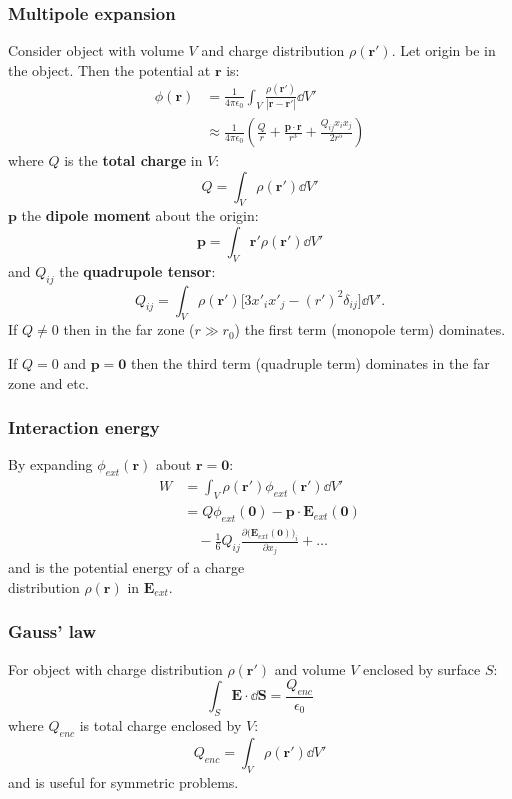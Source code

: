 \documentclass{article}
\newcommand{\vc}[1]{\boldsymbol{#1}}
\begin{document}
\begin{multicols*}{3}
\subsubsection*{Multipole expansion}
Consider object with volume $V$ and charge distribution
$\rho(\vc{r}')$. Let origin be in the object.
Then the potential at $\vc{r}$ is:
\begin{align*}
    \phi(\vc{r})
    &=\frac{1}{4\pi\epsilon_0}\int_V
    \frac{\rho(\vc{r}')}{|\vc{r}-\vc{r}'|}\dd V' \\
    &\approx\frac{1}{4\pi\epsilon_0}\left(
    \frac{Q}{r}+\frac{\vc{p}\cdot\vc{r}}{r^3}
    +\frac{Q_{ij}x_i x_j}{2r^5}\right)
\end{align*}
where $Q$ is the \textbf{total charge} in $V$:
$$Q=\int_V\rho(\vc{r}')\dd V'$$
$\vc{p}$ the \textbf{dipole moment} about the origin:
$$\vc{p}=\int_V\vc{r}'\rho(\vc{r}')\dd V'$$
and $Q_{ij}$ the \textbf{quadrupole tensor}:
$$Q_{ij}=\int_V\rho(\vc{r}')
\bigg[3x'_i x'_j-(r')^2\delta_{ij}\bigg]\dd V'.$$
If $Q\neq0$ then in the far zone ($r\gg r_0$)
the first term (monopole term) dominates.

If $Q=0$ and $\vc{p}=\vc{0}$ then
the third term (quadruple term)
dominates in the far zone and etc.

\subsubsection*{Interaction energy}
By expanding $\phi_{ext}(\vc{r})$ about $\vc{r}=\vc{0}$:
\begin{align*}
    W
    &=\int_V\rho(\vc{r}')\phi_{ext}(\vc{r}')\dd V' \\
    &=Q\phi_{ext}(\vc{0})-\vc{p}\cdot\vc{E}_{ext}(\vc{0}) \\
    &\quad-\frac{1}{6}Q_{ij}\frac{\partial
    \big(\vc{E}_{ext}(\vc{0})\big)_i}
    {\partial x_j}+\dots
\end{align*}
and is the potential energy of a charge \\
distribution $\rho(\vc{r})$ in $\vc{E}_{ext}$.

\subsubsection*{Gauss' law}
For object with charge distribution
$\rho(\vc{r}')$ and volume $V$ enclosed by surface $S$:
$$\int_S\vc{E}\cdot\dd\vc{S}=\frac{Q_{enc}}{\epsilon_0}$$
where $Q_{enc}$ is total charge enclosed by $V$:
$$Q_{enc}=\int_V\rho(\vc{r}')\dd V'$$
and is useful for symmetric problems.


\end{multicols*}
\end{document}

